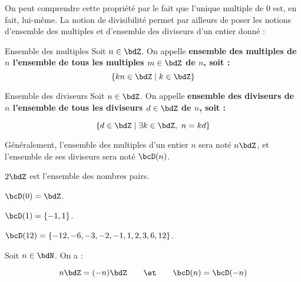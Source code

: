 \documentclass[a4paper,french,bookmarks]{article}
\begin{document}

On peut comprendre cette propriété par le fait que l'unique multiple de $0$ est, en fait, lui-même. La notion de divisibilité permet par ailleurs de poser les notions d'ensemble des multiples et d'ensemble des diviseurs d'un entier donné :

\begin{definition}{Ensemble des multiples}{}
    Soit $n \in \bdZ$. On appelle \bf{ensemble des multiples de $n$} l'ensemble de tous les multiples $m \in \bdZ$ de $n$, soit :
    \[ \{kn \in \bdZ \mid k \in \bdZ\}\]
\end{definition}



\begin{definition}{Ensemble des diviseurs}{}
    Soit $n \in \bdZ$. On appelle \bf{ensemble des diviseurs de $n$} l'ensemble de tous les diviseurs $d \in \bdZ$ de $n$, soit :
    
    \[ \{d \in \bdZ \mid \exists k \in \bdZ,\ n = kd\}\]
\end{definition}


Généralement, l'ensemble des multiples d'un entier $n$ sera noté $n\bdZ$, et l'ensemble de ses diviseurs sera noté $\bcD(n)$.

\begin{example}{}{}
    \begin{multicols}{2}
        \begin{enumerate}
            \ithand $2\bdZ$ est l'ensemble des nombres pairs.
            
            \ithand $\bcD(0) = \bdZ$.
            
            \ithand $\bcD(1) = \{-1, 1\}$.
            
            \ithand $\bcD(12) = \{-12, -6, -3, -2, -1, 1, 2, 3, 6, 12\}$.
        \end{enumerate}
    \end{multicols}
\end{example}

\begin{property}{}{}
    Soit $n \in \bdN$. On a :
    
    \[n\bdZ = (-n)\bdZ\qquad \et \qquad \bcD(n) = \bcD(-n)\]
\end{property}
\end{document}
